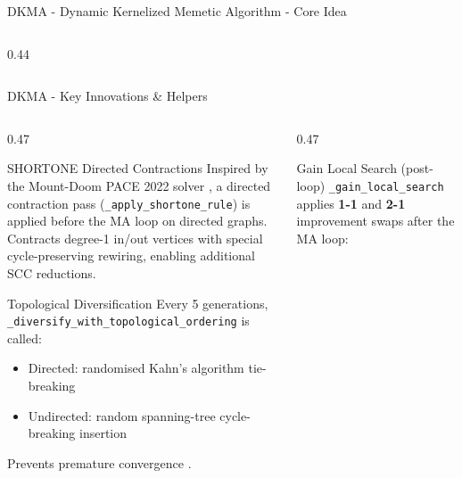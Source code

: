 \documentclass[aspectratio=169]{beamer}
\begin{document}
\begin{frame}{DKMA - Dynamic Kernelized Memetic Algorithm - Core Idea}
\begin{columns}[T]
\begin{column}{0.44\textwidth}
		\end{column}
	\end{columns}
\end{frame}

\begin{frame}{DKMA - Key Innovations \& Helpers}
	\tiny
	\begin{columns}[T]
		\begin{column}{0.47\textwidth}
			\begin{block}{SHORTONE Directed Contractions}
				Inspired by the Mount-Doom PACE 2022 solver \cite{langedal2022},
				a directed contraction pass (\texttt{\_apply\_shortone\_rule})
				is applied before the MA loop on directed graphs.\\[3pt]
				Contracts degree-1 in/out vertices with special cycle-preserving rewiring,
				enabling additional SCC reductions.
			\end{block}
			\vspace{4pt}
			\begin{block}{Topological Diversification}
				Every 5 generations, \texttt{\_diversify\_with\_topological\_ordering}
				is called:\\
				\begin{itemize}
					\item Directed: randomised Kahn's algorithm tie-breaking
					\item Undirected: random spanning-tree cycle-breaking insertion
				\end{itemize}
				Prevents premature convergence \cite{lust2010}.
			\end{block}
		\end{column}
		\begin{column}{0.47\textwidth}
			\begin{block}{Gain Local Search (post-loop)}
				\texttt{\_gain\_local\_search} applies \textbf{1-1} and \textbf{2-1}
				improvement swaps after the MA loop:
				\begin{itemize}

\end{itemize}
\end{block}
\end{column}
\end{columns}
\end{frame}
\end{document}
